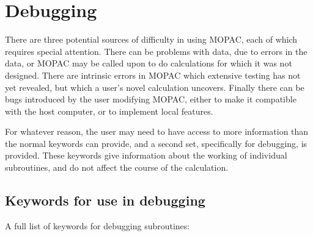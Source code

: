 \chapter{Debugging}
There are three potential sources of  difficulty  in  using  MOPAC, each  of 
which  requires special attention.  There can be problems with data, due to
errors in the data, or MOPAC  may  be  called  upon  to  do calculations  for
which it was not designed.  There are intrinsic errors in MOPAC which extensive
testing has  not  yet  revealed,  but  which  a user's novel calculation
uncovers.  Finally there can be bugs introduced by the user modifying MOPAC,
either to make it compatible with the  host computer, or to implement local
features.

For whatever reason, the user may  need  to  have  access  to  more
information  than  the  normal  keywords  can provide, and a second set,
specifically  for  debugging,  is   provided.    These   keywords   give
information  about  the  working  of  individual subroutines, and do not affect
the course of the calculation.

\section{Keywords for use in debugging}
A full list of keywords for debugging subroutines:

